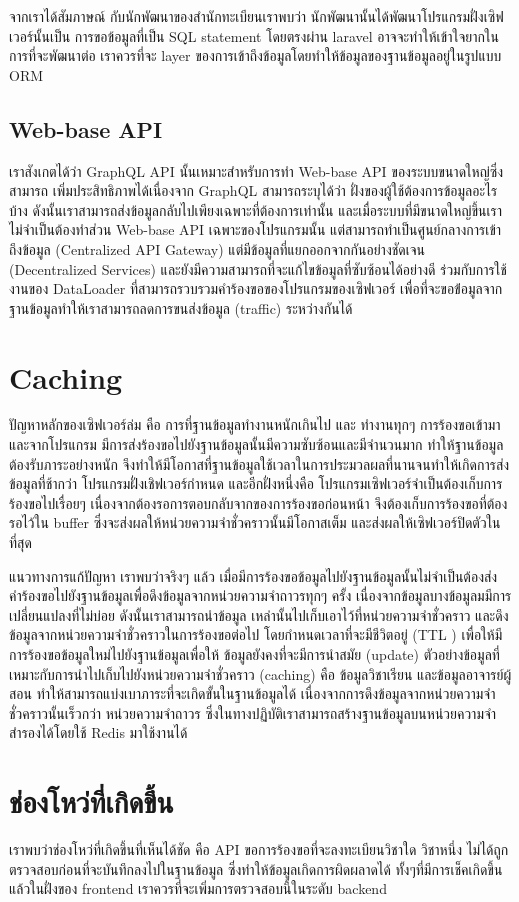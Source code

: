 จากเราได้สัมภาษณ์ กับนักพัฒนาของสำนักทะเบียนเราพบว่า นักพัฒนานั้นได้พัฒนาโปรแกรมฝั่งเซิฟเวอร์นั้นเป็น การขอข้อมูลที่เป็น SQL statement โดยตรงผ่าน laravel อาจจะทำให้เข้าใจยากในการที่จะพัฒนาต่อ เราควรที่จะ layer ของการเข้าถึงข้อมูลโดยทำให้ข้อมูลของฐานข้อมูลอยู่ในรูปแบบ ORM \cite{orm}

\subsection{Web-base API}

เราสังเกตได้ว่า GraphQL API \cite{graphql} นั้นเหมาะสำหรับการทำ Web-base API ของระบบขนาดใหญ่ซึ่งสามารถ เพิ่มประสิทธิภาพได้เนื่องจาก GraphQL สามารถระบุได้ว่า ฝั่งของผู้ใช้ต้องการข้อมูลอะไรบ้าง ดังนั้นเราสามารถส่งข้อมูลกลับไปเพียงเฉพาะที่ต้องการเท่านั้น และเมื่อระบบที่มีขนาดใหญ่ขึ้นเรา ไม่จำเป็นต้องทำส่วน Web-base API เฉพาะของโปรแกรมนั้น แต่สามารถทำเป็นศูนย์กลางการเข้าถึงข้อมูล (Centralized API Gateway) แต่มีข้อมูลที่แยกออกจากกันอย่างชัดเจน (Decentralized Services) และยังมีความสามารถที่จะแก้ไขข้อมูลที่ซับซ้อนได้อย่างดี \cite{graphqlexec} ร่วมกับการใช้งานของ DataLoader ที่สามารถรวบรวมคำร้องขอของโปรแกรมของเซิฟเวอร์ เพื่อที่จะขอข้่อมูลจากฐานข้อมูลทำให้เราสามารถลดการขนส่งข้อมูล (traffic) ระหว่างกันได้

\section{Caching}

ปัญหาหลักของเซิฟเวอร์ล่ม คือ การที่ฐานข้อมูลทำงานหนักเกินไป และ ทำงานทุกๆ การร้องขอเข้ามา และจากโปรแกรม มีการส่งร้องขอไปยังฐานข้อมูลนั้นมีความซับซ้อนและมีจำนวนมาก ทำให้ฐานข้อมูลต้องรับภาระอย่างหนัก จึงทำให้มีโอกาสที่ฐานข้อมูลใช้เวลาในการประมวลผลที่นานจนทำให้เกิดการส่งข้อมูลที่ช้ากว่า โปรแกรมฝั่งเชิฟเวอร์กำหนด และอีกฝั่งหนึ่งคือ โปรแกรมเซิฟเวอร์จำเป็นต้องเก็บการร้องขอไปเรื่อยๆ เนื่องจากต้องรอการตอบกลับจากของการร้องขอก่อนหน้า จึงต้องเก็บการร้องขอที่ต้องรอไว้ใน buffer ซึ่งจะส่งผลให้หน่วยความจำชั่วคราวนั้นมีโอกาสเต็ม และส่งผลให้เซิฟเวอร์ปิดตัวในที่สุด

แนวทางการแก้ปัญหา เราพบว่าจริงๆ แล้ว เมื่อมีการร้องขอข้อมูลไปยังฐานข้อมูลนั้นไม่จำเป็นต้องส่งคำร้องขอไปยังฐานข้อมูลเพื่อดึงข้อมูลจากหน่วยความจำถาวรทุกๆ ครั้ง เนื่องจากข้อมูลบางข้อมูลมมีการเปลี่ยนแปลงที่ไม่บ่อย ดังนั้นเราสามารถนำข้อมูล เหล่านั้นไปเก็บเอาไว้ที่หน่วยความจำชั่วคราว และดึงข้อมูลจากหน่วยความจำชั่วคราวในการร้องขอต่อไป โดยกำหนดเวลาที่จะมีชีวิตอยู่ (TTL \cite{ttl}) เพื่อให้มีการร้องขอข้อมูลใหม่ไปยังฐานข้อมูลเพื่อให้ ข้อมูลยังคงที่จะมีการนำสมัย (update) ตัวอย่างข้อมูลที่เหมาะกับการนำไปเก็บไปยังหน่วยความจำชั่วคราว (caching) คือ ข้อมูลวิชาเรียน และข้อมูลอาจารย์ผู้สอน ทำให้สามารถแบ่งเบาภาระที่จะเกิดขั้นในฐานข้อมูลได้ เนื่องจากการดึงข้อมูลจากหน่วยความจำชั่วคราวนั้นเร็วกว่า หน่วยความจำถาวร ซึ่งในทางปฏิบัติเราสามารถสร้างฐานข้อมูลบนหน่วยความจำสำรองได้โดยใช้ Redis \cite{redis} มาใช้งานได้

\section{ช่องโหว่ที่เกิดขึ้น}

เราพบว่าช่องโหว่ที่เกิดขึ้นที่เห็นได้ชัด คือ API ขอการร้องขอที่จะลงทะเบียนวิชาใด วิชาหนึ่ง ไม่ได้ถูกตรวจสอบก่อนที่จะบันทึกลงไปในฐานข้อมูล ซึ่งทำให้ข้อมูลเกิดการผิดผลาดได้ ทั้งๆที่มีการเช็คเกิดขึ้นแล้วในฝั่งของ frontend เราควรที่จะเพิ่มการตรวจสอบนี้ในระดับ backend